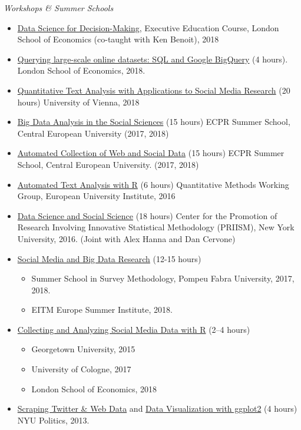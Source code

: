 \documentclass[margin,line,11pt]{resume}
\begin{document}
\begin{resume}
\emph{Workshops \& Summer Schools}
\begin{itemize}
\item \href{https://www.lse.ac.uk/study-at-lse/executive-education/courses/secure/business-and-management/data-science-for-decision-making}{Data Science for Decision-Making}, Executive Education Course, London School of Economics (co-taught with Ken Benoit), 2018
\item \href{http://pablobarbera.com/SQL-workshop/}{Querying large-scale online datasets: SQL and Google BigQuery} (4 hours). London School of Economics, 2018.
\item \href{http://pablobarbera.com/text-analysis-vienna/}{Quantitative Text Analysis with Applications to Social Media Research} (20 hours) University of Vienna, 2018
\item \href{https://ecpr.eu/Events/PanelDetails.aspx?PanelID=7061&EventID=116}{Big Data Analysis in the Social Sciences} (15 hours) ECPR Summer School, Central European University (2017, 2018)
\item \href{https://ecpr.eu/Events/PanelDetails.aspx?PanelID=7055&EventID=116}{Automated Collection of Web and Social Data} (15 hours) ECPR Summer School, Central European University. (2017, 2018)
\item \href{https://github.com/pablobarbera/eui-text-workshop}{Automated Text Analysis with R} (6 hours) Quantitative Methods Working Group, European University Institute, 2016
\item \href{https://github.com/pablobarbera/data-science-workshop}{Data Science and Social Science} (18 hours) Center for the Promotion of Research Involving Innovative Statistical Methodology (PRIISM), New York University, 2016. (Joint with Alex Hanna and Dan Cervone)
\item \href{http://pablobarbera.com/eitm}{Social Media and Big Data Research} (12-15 hours)
\begin{itemize}
\vspace{-.1cm}
\item Summer School in Survey Methodology, Pompeu Fabra University, 2017, 2018.
\vspace{-.1cm}
\item EITM Europe Summer Institute, 2018.
\end{itemize}
\item \href{http://pablobarbera.com/social-media-workshop/}{Collecting and Analyzing Social Media Data with R} (2--4 hours)
\begin{itemize}
\vspace{-.1cm}
\item Georgetown University, 2015
\vspace{-.1cm}
\item University of Cologne, 2017
\vspace{-.1cm}
\item London School of Economics, 2018
\end{itemize}
\item \href{https://github.com/pablobarbera/workshop}{Scraping Twitter \& Web Data} and \href{https://github.com/pablobarbera/Rdataviz}{Data Visualization with ggplot2} (4 hours) NYU Politics, 2013.
\end{itemize}


\end{resume}
\end{document}
